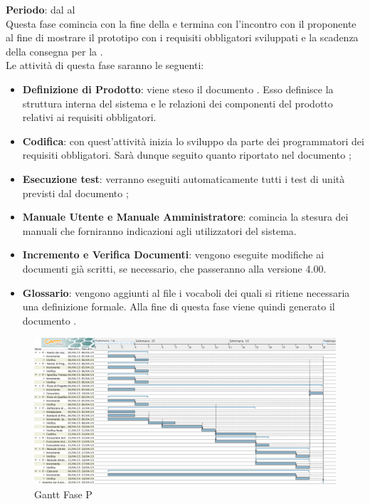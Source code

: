 	\textbf{Periodo}: dal  al  \\Questa fase comincia con la fine della  e termina con l'incontro con il proponente al fine di mostrare il prototipo con i requisiti obbligatori sviluppati e la scadenza della consegna per la .\\Le attività di questa fase saranno le seguenti:
	\begin{itemize}
		\item\textbf{Definizione di Prodotto}: viene steso il documento . Esso definisce la struttura interna del sistema e le relazioni dei componenti del prodotto relativi ai requisiti obbligatori.
		\item \textbf{Codifica}: con quest'attività inizia lo sviluppo da parte dei programmatori dei requisiti obbligatori. Sarà dunque seguito quanto riportato nel documento ;
		\item \textbf{Esecuzione test}: verranno eseguiti automaticamente tutti i test di unità previsti dal documento ;
		\item\textbf{Manuale Utente e Manuale Amministratore}: comincia la stesura dei manuali che forniranno indicazioni agli utilizzatori del sistema.
		\item\textbf{Incremento e Verifica Documenti}: vengono eseguite modifiche ai documenti già scritti, se necessario, che passeranno alla versione 4.00.
		\item\textbf{Glossario}: vengono aggiunti al file  i vocaboli dei quali si ritiene necessaria una definizione formale. Alla fine di questa fase viene quindi generato il documento .
	\end{itemize}
	\begin{figure}[H]\centering
		\includegraphics[width=\textwidth]{PianoDiProgetto/Pics/FaseP.png}
	\caption{Gantt Fase P}
\end{figure}